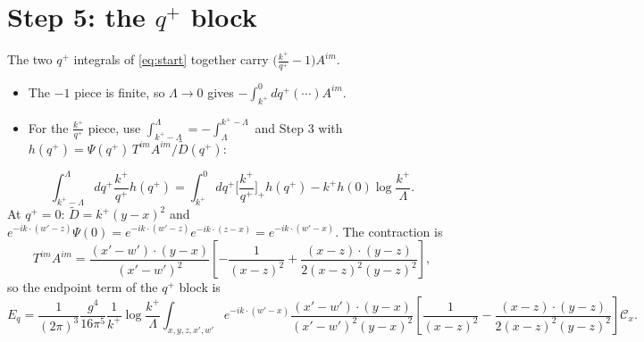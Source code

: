 \documentclass[10pt]{article}
\numberwithin{equation}{section}
\begin{document}
\section{Step 5: the $q^{+}$ block}
The two $q^{+}$ integrals of \eqref{eq:start} together carry $\big(\frac{k^{+}}{q^{+}}-1\big)A^{im}$.
\begin{itemize}
\item The $-1$ piece is finite, so $\Lambda\to0$ gives $-\int_{k^{+}}^{0}dq^{+}(\cdots)A^{im}$.
\item For the $\frac{k^{+}}{q^{+}}$ piece, use $\int_{k^{+}-\Lambda}^{\Lambda}=-\int_{\Lambda}^{k^{+}-\Lambda}$ and Step 3 with $h(q^{+})=\Psi(q^{+})\,T^{im}A^{im}/\widetilde D(q^{+})$:
\end{itemize}
\begin{equation}
\int_{k^{+}-\Lambda}^{\Lambda}dq^{+}\frac{k^{+}}{q^{+}}h(q^{+})=\int_{k^{+}}^{0}dq^{+}\Big[\frac{k^{+}}{q^{+}}\Big]_{+}h(q^{+})-k^{+}h(0)\log\frac{k^{+}}{\Lambda}.
\end{equation}
At $q^{+}=0$: $\widetilde D=k^{+}(y-x)^{2}$ and $e^{-ik\cdot(w'-z)}\Psi(0)=e^{-ik\cdot(w'-z)}e^{-ik\cdot(z-x)}=e^{-ik\cdot(w'-x)}$. The contraction is
\begin{equation}
T^{im}A^{im}=\frac{(x'-w')\cdot(y-x)}{(x'-w')^{2}}\left[-\frac{1}{(x-z)^{2}}+\frac{(x-z)\cdot(y-z)}{2(x-z)^{2}(y-z)^{2}}\right],
\end{equation}
so the endpoint term of the $q^{+}$ block is
\begin{equation}
E_{q}=\frac{1}{(2\pi)^{3}}\frac{g^{4}}{16\pi^{5}}\frac{1}{k^{+}}\log\frac{k^{+}}{\Lambda}\int_{x,y,z,x',w'}e^{-ik\cdot(w'-x)}\frac{(x'-w')\cdot(y-x)}{(x'-w')^{2}(y-x)^{2}}\left[\frac{1}{(x-z)^{2}}-\frac{(x-z)\cdot(y-z)}{2(x-z)^{2}(y-z)^{2}}\right]\mathcal{C}_{x}.
\end{equation}
\end{document}
